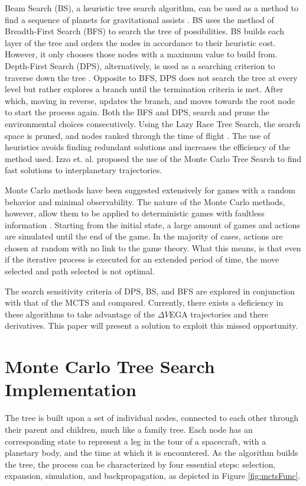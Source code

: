 \documentclass[letterpaper, preprint, paper,11pt]{AAS}	%
\newcommand*\circled[1]{\tikz[baseline=(char.base)]{
            \node[shape=circle,draw,inner sep=0.8pt] (char) {#1};}}
\begin{document}
Beam Search (BS), a heuristic tree search algorithm, can be used as a method to find a sequence of planets for gravitational assists \cite{Penas2019}. BS uses the method of Breadth-First Search (BFS) to search the tree of possibilities. BS builds each layer of the tree and orders the nodes in accordance to their heuristic cost. However, it only chooses those nodes with a maximum value to build from. Depth-First Search (DPS), alternatively, is used as a searching criterion to traverse down the tree \cite{Izzo2013}. Opposite to BFS, DPS does not search the tree at every level but rather explores a branch until the termination criteria is met. After which, moving in reverse, updates the branch, and moves towards the root node to start the process again. Both the BFS and DPS, search and prune the environmental choices consecutively. Using the Lazy Race Tree Search, the search space is pruned, and nodes ranked through the time of flight \cite{Izzo2013}. The use of heuristics avoids finding redundant solutions and increases the efficiency of the method used. Izzo et. al. \cite{Hennes2015} proposed the use of the Monte Carlo Tree Search to find fast solutions to interplanetary trajectories.  

Monte Carlo methods have been suggested extensively for games with a random behavior and minimal observability. The nature of the Monte Carlo methods, however, allow them to be applied to deterministic games with faultless information \cite{Browne2012}. Starting from the initial state, a large amount of games and actions are simulated until the end of the game. In the majority of cases, actions are chosen at random with no link to the game theory. What this means, is that even if the iterative process is executed for an extended period of time, the move selected and path selected is not optimal.  

The search sensitivity criteria of DPS, BS, and BFS are explored in conjunction with that of the MCTS and compared. Currently, there exists a deficiency in these algorithms to take advantage of the $\Delta V$EGA trajectories and there derivatives. This paper will present a solution to exploit this missed opportunity.

\section{Monte Carlo Tree Search Implementation}

The tree is built upon a set of individual nodes, connected to each other through their parent and children, much like a family tree. Each node has an corresponding state to represent a leg in the tour of a spacecraft, with a planetary body, and the time at which it is encountered. As the algorithm builds the tree, the process can be characterized by four essential steps: \circled{1} selection, \circled{2} expansion, \circled{3} simulation, and \circled{4} backpropagation, as depicted in Figure \ref*{fig:mctsFunc}. 
\end{document}
